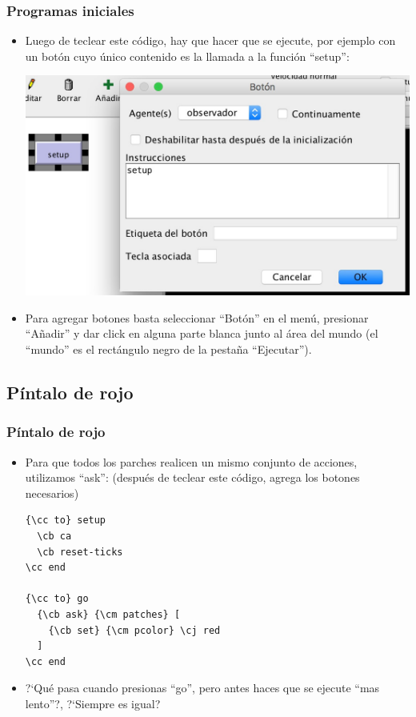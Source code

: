 \documentclass{beamer}
\begin{document}
\begin{frame}[t]
\frametitle{Programas iniciales}
\begin{itemize}[<+-| alert@+>]
	\item Luego de teclear este código, hay que hacer que se ejecute, por ejemplo con un botón cuyo único contenido es la llamada a la función ``setup'':
	\begin{center}{\includegraphics[width=.5\textwidth]{setup}}\end{center}
	\item Para agregar botones basta seleccionar ``Botón'' en el menú, presionar ``Añadir'' y dar click en alguna parte blanca junto al área del mundo (el ``mundo'' es el rectángulo negro de la pestaña ``Ejecutar'').
\end{itemize}
\end{frame}

\newcommand{\cb}{\color{blue}}
\newcommand{\cc}{\color{cyan}}
\newcommand{\cm}{\color{magenta}}
\newcommand{\cj}{\color{red}}

\subsection{Píntalo de rojo}
\begin{frame}[fragile]
\frametitle{Píntalo de rojo}
\begin{itemize}[<+->]
	\item Para que todos los parches realicen un mismo conjunto de acciones, utilizamos ``ask'': (después de teclear este código, agrega los botones necesarios)
	\begin{Verbatim}[commandchars=\\\{\}]
{\cc to} setup
  \cb ca
  \cb reset-ticks
\cc end

{\cc to} go
  {\cb ask} {\cm patches} [
    {\cb set} {\cm pcolor} \cj red
  ]
\cc end
\end{Verbatim}
\item ?`Qué pasa cuando presionas ``go'', pero antes haces que se ejecute ``mas lento''?, ?`Siempre es igual?
\end{itemize}
\end{frame}
\end{document}
